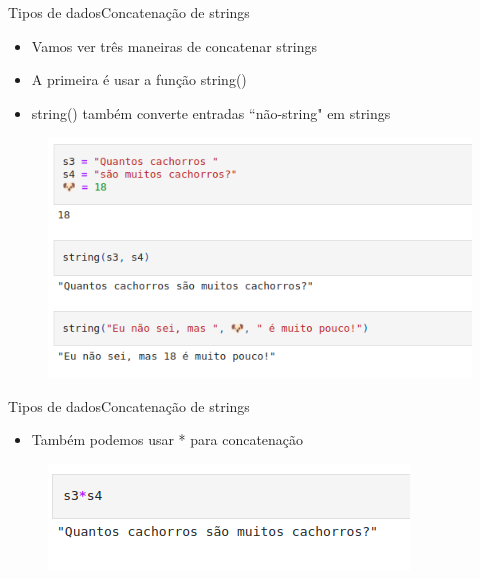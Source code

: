\documentclass{beamer}
\begin{document}
\begin{frame}{Tipos de dados}{Concatenação de strings}
    \begin{itemize}
        \item Vamos ver três maneiras de concatenar strings
        \item A primeira é usar a função string()
        \item string() também converte entradas ``não-string" em strings
    \end{itemize}
    \begin{figure}
        \centering
        \includegraphics[scale=0.4]{imagens/string04.png}
        \label{fig:my_label}
    \end{figure}
\end{frame}

\begin{frame}{Tipos de dados}{Concatenação de strings}
    \begin{itemize}
        \item Também podemos usar * para concatenação
    \end{itemize}
    \begin{figure}
        \centering
        \includegraphics[scale=0.5]{imagens/string05.png}
        \label{fig:my_label}
    \end{figure}
\end{frame}
\end{document}
